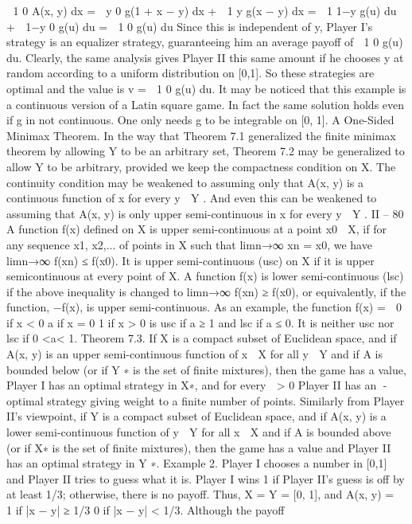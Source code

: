  1
0
A(x, y) dx =
 y
0
g(1 + x − y) dx +
 1
y
g(x − y) dx
=
 1
1−y
g(u) du +
 1−y
0
g(u) du =
 1
0
g(u) du
Since this is independent of y, Player I’s strategy is an equalizer strategy, guaranteeing
him an average payoff of  1
0 g(u) du. Clearly, the same analysis gives Player II this same
amount if he chooses y at random according to a uniform distribution on [0,1]. So these
strategies are optimal and the value is v =  1
0 g(u) du. It may be noticed that this example
is a continuous version of a Latin square game. In fact the same solution holds even if g
in not continuous. One only needs g to be integrable on [0, 1].
A One-Sided Minimax Theorem. In the way that Theorem 7.1 generalized the
finite minimax theorem by allowing Y to be an arbitrary set, Theorem 7.2 may be generalized
to allow Y to be arbitrary, provided we keep the compactness condition on X.
The continuity condition may be weakened to assuming only that A(x, y) is a continuous
function of x for every y ∈ Y . And even this can be weakened to assuming that A(x, y) is
only upper semi-continuous in x for every y ∈ Y .
II – 80
A function f(x) defined on X is upper semi-continuous at a point x0 ∈ X, if for any
sequence x1, x2,... of points in X such that limn→∞ xn = x0, we have limn→∞ f(xn) ≤
f(x0). It is upper semi-continuous (usc) on X if it is upper semicontinuous at every point
of X. A function f(x) is lower semi-continuous (lsc) if the above inequality is changed to
limn→∞ f(xn) ≥ f(x0), or equivalently, if the function, −f(x), is upper semi-continuous.
As an example, the function
f(x) =  0 if x < 0
a if x = 0
1 if x > 0
is usc if a ≥ 1 and lsc if a ≤ 0. It is neither usc nor lsc if 0 <a< 1.
Theorem 7.3. If X is a compact subset of Euclidean space, and if A(x, y) is an upper
semi-continuous function of x ∈ X for all y ∈ Y and if A is bounded below (or if Y ∗ is the
set of finite mixtures), then the game has a value, Player I has an optimal strategy in X∗,
and for every  > 0 Player II has an -optimal strategy giving weight to a finite number of
points.
Similarly from Player II’s viewpoint, if Y is a compact subset of Euclidean space, and
if A(x, y) is a lower semi-continuous function of y ∈ Y for all x ∈ X and if A is bounded
above (or if X∗ is the set of finite mixtures), then the game has a value and Player II has
an optimal strategy in Y ∗.
Example 2. Player I chooses a number in [0,1] and Player II tries to guess what it
is. Player I wins 1 if Player II’s guess is off by at least 1/3; otherwise, there is no payoff.
Thus, X = Y = [0, 1], and A(x, y) =  1 if |x − y| ≥ 1/3
0 if |x − y| < 1/3. Although the payoff
